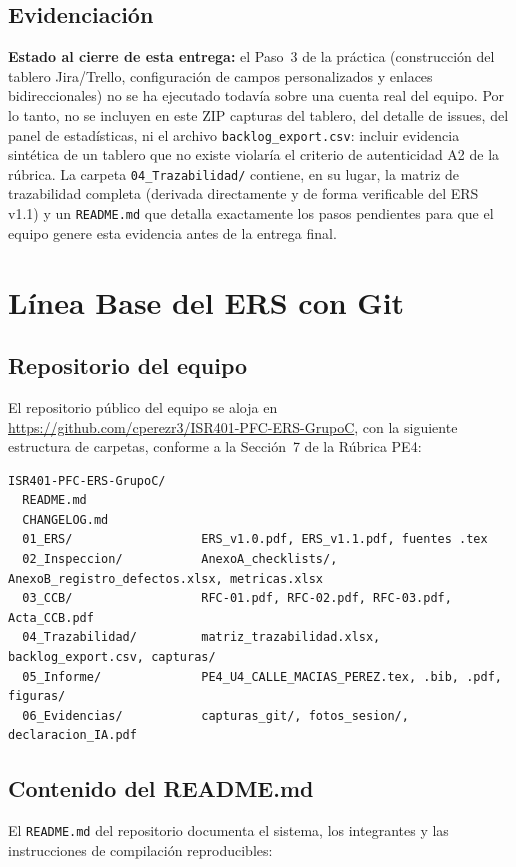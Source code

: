 \documentclass[11pt,a4paper]{article}
\begin{document}
\subsection{Evidenciación}
\label{sec:evidenciacion-case}
\textbf{Estado al cierre de esta entrega:} el Paso~3 de la práctica (construcción del tablero Jira/Trello, configuración de campos personalizados y enlaces bidireccionales) no se ha ejecutado todavía sobre una cuenta real del equipo. Por lo tanto, no se incluyen en este ZIP capturas del tablero, del detalle de issues, del panel de estadísticas, ni el archivo \texttt{backlog\_export.csv}: incluir evidencia sintética de un tablero que no existe violaría el criterio de autenticidad A2 de la rúbrica. La carpeta \texttt{04\_Trazabilidad/} contiene, en su lugar, la matriz de trazabilidad completa (derivada directamente y de forma verificable del ERS v1.1) y un \texttt{README.md} que detalla exactamente los pasos pendientes para que el equipo genere esta evidencia antes de la entrega final.

\section{Línea Base del ERS con Git}

\subsection{Repositorio del equipo}
El repositorio público del equipo se aloja en \url{https://github.com/cperezr3/ISR401-PFC-ERS-GrupoC}, con la siguiente estructura de carpetas, conforme a la Sección~7 de la Rúbrica PE4:

\begin{verbatim}
ISR401-PFC-ERS-GrupoC/
  README.md
  CHANGELOG.md
  01_ERS/                  ERS_v1.0.pdf, ERS_v1.1.pdf, fuentes .tex
  02_Inspeccion/           AnexoA_checklists/, AnexoB_registro_defectos.xlsx, metricas.xlsx
  03_CCB/                  RFC-01.pdf, RFC-02.pdf, RFC-03.pdf, Acta_CCB.pdf
  04_Trazabilidad/         matriz_trazabilidad.xlsx, backlog_export.csv, capturas/
  05_Informe/              PE4_U4_CALLE_MACIAS_PEREZ.tex, .bib, .pdf, figuras/
  06_Evidencias/           capturas_git/, fotos_sesion/, declaracion_IA.pdf
\end{verbatim}

\subsection{Contenido del README.md}
El \texttt{README.md} del repositorio documenta el sistema, los integrantes y las instrucciones de compilación reproducibles:
\end{document}

